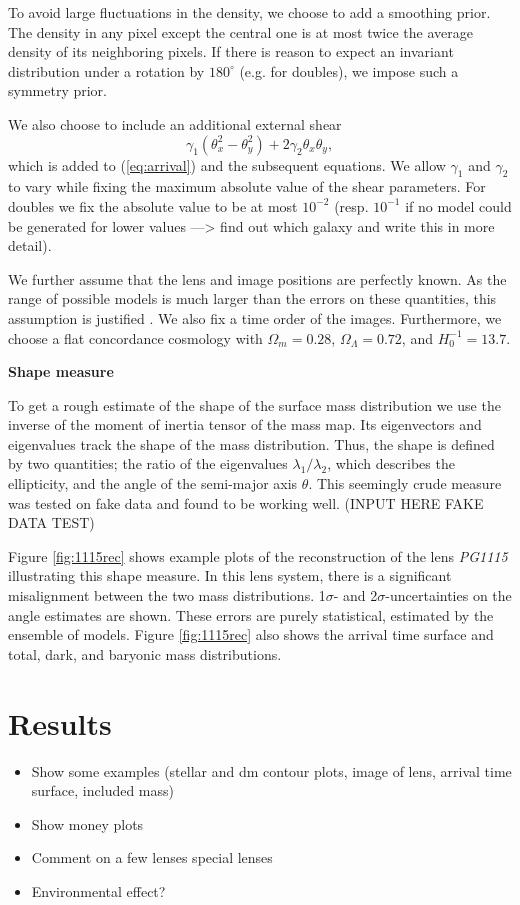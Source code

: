 \documentclass[useAMS,usenatbib]{mn2e}
\begin{document}
To avoid large fluctuations in the density, we choose to add a smoothing prior. The density in any pixel except the central one is at most twice the average density of its neighboring pixels. If there is reason to expect an invariant distribution under a rotation by $180^{\circ}$ (e.g. for doubles), we impose such a symmetry prior.

We also choose to include an additional external shear
\begin{equation}
  \gamma_{1}\left(\theta_{x}^{2}-\theta_{y}^{2}\right)+2\gamma_{2}\theta_{x}\theta_{y},
\end{equation}
which is added to (\ref{eq:arrival}) and the subsequent equations. We allow $\gamma_{1}$ and $\gamma_{2}$ to vary while fixing the maximum absolute value of the shear parameters. For doubles we fix the absolute value to be at most $10^{-2}$ (resp. $10^{-1}$ if no model could be generated for lower values ---> find out which galaxy and write this in more detail).

We further assume that the lens and image positions are perfectly known. As the range of possible models is much larger than the errors on these quantities, this assumption is justified \citep{2006ApJ...650L..17S}. We also fix a time order of the images. Furthermore, we choose a flat concordance cosmology with $\Omega_{m}=0.28$, $\Omega_{\Lambda}=0.72$, and $H_{0}^{-1}=13.7$.

\textbf{Shape measure}

To get a rough estimate of the shape of the surface mass distribution we use the inverse of the moment of inertia tensor of the mass map. Its eigenvectors and eigenvalues track the shape of the mass distribution. Thus, the shape is defined by two quantities; the ratio of the eigenvalues $\lambda_{1}/\lambda_{2}$, which describes the ellipticity, and the angle of the semi-major axis $\theta$. This seemingly crude measure was tested on fake data and found to be working well. (INPUT HERE FAKE DATA TEST)

Figure \ref{fig:1115rec} shows example plots of the reconstruction of the lens \textit{PG1115} illustrating this shape measure. In this lens system, there is a significant misalignment between the two mass distributions. 1$\sigma$- and 2$\sigma$-uncertainties on the angle estimates are shown. These errors are purely statistical, estimated by the ensemble of models. Figure \ref{fig:1115rec} also shows the arrival time surface and total, dark, and baryonic mass distributions.


\section{Results}\label{sec:results}
\begin{itemize}
\item Show some examples (stellar and dm contour plots, image of lens, arrival time surface, included mass)
\item Show money plots
\item Comment on a few lenses special lenses
\item Environmental effect?
\end{itemize}
\end{document}
